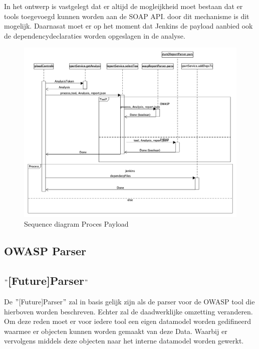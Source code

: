 In het ontwerp is vastgelegt dat er altijd de mogleijkheid moet bestaan dat er tools toegevoegd kunnen worden aan de SOAP API. door dit mechanisme is dit mogelijk. Daarnasat moet er op het moment dat Jenkins de payload aanbied ook de dependencydeclaraties worden opgeslagen in de analyse.

\begin{figure}[bth]
    \myfloatalign
    \includegraphics[width=14cm]{gfx/umlet/exports/SeqProcessPayload}
    \caption{Sequence diagram Proces Payload}
    \label{fig:ProcesPayload}
\end{figure}

\subsection{OWASP Parser}\label{subsec:owasp-parser}

\subsection{$"$[Future]Parser$"$}\label{subsec:$"$[future]parser$"$}
De $"$[Future]Parser$"$ zal in basis gelijk zijn als de parser voor de OWASP tool die hierboven worden beschreven. Echter zal de daadwerklijke omzetting veranderen. Om deze reden moet er voor iedere tool een eigen datamodel worden gedifineerd waarmee er objecten kunnen worden gemaakt van deze Data. Waarbij er vervolgens middels deze objecten naar het interne datamodel worden gewerkt.






